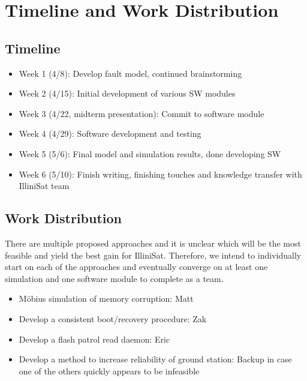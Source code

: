 \section{Timeline and Work Distribution}

\subsection{Timeline}
\begin{itemize}
  \item Week 1 (4/8): Develop fault model, continued brainstorming
  \item Week 2 (4/15): Initial development of various SW modules
  \item Week 3 (4/22, midterm presentation): Commit to software module
  \item Week 4 (4/29): Software development and testing
  \item Week 5 (5/6): Final model and simulation results, done developing SW
  \item Week 6 (5/10): Finish writing, finishing touches and knowledge transfer
  with IlliniSat team
\end{itemize}

\subsection{Work Distribution}
There are multiple proposed approaches and it is unclear which will be the most
feasible and yield the best gain for IlliniSat.  Therefore, we intend to
individually start on each of the approaches and eventually converge on at least
one simulation and one software module to complete as a team.

\begin{itemize}
  \item{M\"obius simulation of memory corruption}: Matt
  \item{Develop a consistent boot/recovery procedure}: Zak
  \item{Develop a flash patrol read daemon}: Eric
  \item{Develop a method to increase reliability of ground station}: Backup in
  case one of the others quickly appears to be infeasible
\end{itemize}
